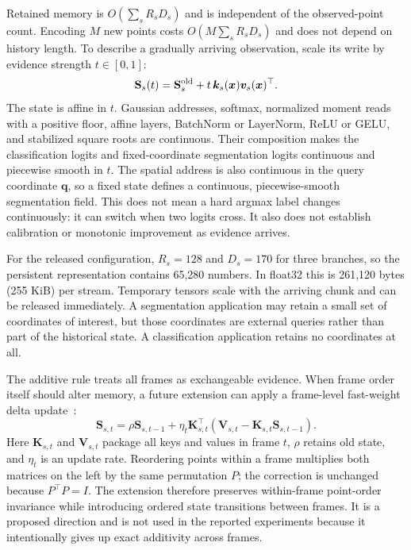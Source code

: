 \documentclass[times,twocolumn,final,authoryear]{elsarticle}
\newcommand{\Sstate}{\mathbf{S}}
\begin{document}
Retained memory is $O(\sum_sR_sD_s)$ and is independent of the observed-point count. Encoding $M$ new points costs $O(M\sum_sR_sD_s)$ and does not depend on history length. To describe a gradually arriving observation, scale its write by evidence strength $t\in[0,1]$:
\begin{equation}
\Sstate_s(t)=\Sstate_s^{\rm old}+t\,\bm k_s(\bm x)\bm v_s(\bm x)^\top .
\label{eq:continuous-main}
\end{equation}
The state is affine in $t$. Gaussian addresses, softmax, normalized moment reads with a positive floor, affine layers, BatchNorm or LayerNorm, ReLU or GELU, and stabilized square roots are continuous. Their composition makes the classification logits and fixed-coordinate segmentation logits continuous and piecewise smooth in $t$. The spatial address is also continuous in the query coordinate $\bm q$, so a fixed state defines a continuous, piecewise-smooth segmentation field. This does not mean a hard argmax label changes continuously: it can switch when two logits cross. It also does not establish calibration or monotonic improvement as evidence arrives.

For the released configuration, $R_s=128$ and $D_s=170$ for three branches, so the persistent representation contains 65,280 numbers. In float32 this is 261,120 bytes (255 KiB) per stream. Temporary tensors scale with the arriving chunk and can be released immediately. A segmentation application may retain a small set of coordinates of interest, but those coordinates are external queries rather than part of the historical state. A classification application retains no coordinates at all.

The additive rule treats all frames as exchangeable evidence. When frame order itself should alter memory, a future extension can apply a frame-level fast-weight delta update~\cite{schlag2021linear}:
\begin{equation}
\Sstate_{s,t}=\rho\Sstate_{s,t-1}+\eta_t\bm K_{s,t}^{\top}
(\bm V_{s,t}-\bm K_{s,t}\Sstate_{s,t-1}).
\label{eq:delta-main}
\end{equation}
Here $\bm K_{s,t}$ and $\bm V_{s,t}$ package all keys and values in frame $t$, $\rho$ retains old state, and $\eta_t$ is an update rate. Reordering points within a frame multiplies both matrices on the left by the same permutation $P$; the correction is unchanged because $P^\top P=I$. The extension therefore preserves within-frame point-order invariance while introducing ordered state transitions between frames. It is a proposed direction and is not used in the reported experiments because it intentionally gives up exact additivity across frames.
\end{document}
